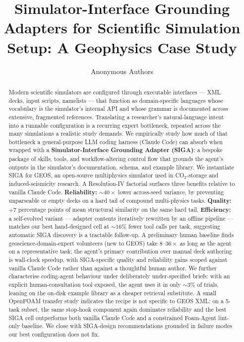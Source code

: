 \documentclass{article}
\title{Simulator-Interface Grounding Adapters for Scientific Simulation Setup: A Geophysics Case Study}
\author{%
  Anonymous Authors\\
}
\begin{document}
\maketitle


\begin{abstract}
Modern scientific simulators are configured through executable interfaces --- XML decks, input scripts, namelists --- that function as domain-specific languages whose vocabulary is the simulator's internal API and whose grammar is documented across extensive, fragmented references. Translating a researcher's natural-language intent into a runnable configuration is a recurring expert bottleneck, repeated across the many simulations a realistic study demands. We empirically study how much of that bottleneck a general-purpose LLM coding harness (Claude Code) can absorb when wrapped with a \textbf{Simulator-Interface Grounding Adapter (SIGA)}: a bespoke package of skills, tools, and workflow-altering control flow that grounds the agent's outputs in the simulator's documentation, schema, and example library. We instantiate SIGA for GEOS, an open-source multiphysics simulator used in CO$_2$-storage and induced-seismicity research. A Resolution-IV factorial surfaces three benefits relative to vanilla Claude Code. \textbf{Reliability:} ${\sim}40{\times}$ lower across-seed variance, by preventing unparseable or empty decks on a hard tail of compound multi-physics tasks. \textbf{Quality:} $+7$ percentage points of mean structural similarity on the same hard tail. \textbf{Efficiency:} a self-evolved variant --- adapter contents iteratively rewritten by an offline pipeline --- matches our best hand-designed cell at ${\sim}16\%$ fewer tool calls per task, suggesting automatic SIGA discovery is a tractable follow-up. A preliminary human baseline finds geoscience-domain-expert volunteers (new to GEOS) take $8\text{--}36\times$ as long as the agent on a representative task; the agent's primary contribution over manual deck authoring is wall-clock speedup, with SIGA-specific quality and reliability gains scoped against vanilla Claude Code rather than against a thoughtful human author. We further characterise coding-agent behaviour under deliberately under-specified briefs: with an explicit human-consultation tool exposed, the agent uses it in only ${\sim}3\%$ of trials, leaning on the on-disk example library as a cheaper retrieval substitute. A small OpenFOAM transfer study indicates the recipe is not specific to GEOS XML: on a 5-task subset, the same stop-hook component again dominates reliability and the best SIGA cell outperforms both vanilla Claude Code and a constrained Foam-Agent lint-only baseline. We close with SIGA-design recommendations grounded in failure modes our best configuration does not fix.
\end{abstract}
\end{document}
